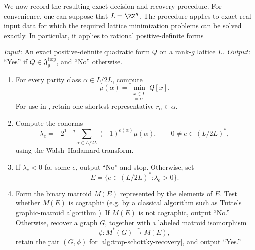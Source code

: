 \documentclass[11pt,letterpaper]{amsart}
\begin{document}
We now record the resulting exact decision-and-recovery procedure.
For convenience, one can suppose that $L=\ZZ^g$. The procedure applies to exact real input data for which the required lattice minimization problems can be solved exactly. In particular, it applies to rational positive-definite forms.

\begin{alg}
\label{alg:trop-schottky-decision}
\emph{Input:} An exact positive-definite quadratic form $Q$ on a
rank-$g$ lattice $L$.
\emph{Output:} ``Yes'' if $Q\in\mathfrak{J}^{\mathrm{trop}}_g$,
and ``No'' otherwise.

\begin{enumerate}
    \item
    For every parity class $\alpha\in L/2L$, compute
    \[
        \mu(\alpha)
        =
        \min_{\substack{x\in L\\ [x]=\alpha}} Q[x].
    \]
    For use in , retain one
    shortest representative $r_\alpha\in\alpha$.

    \item
    Compute the conorms
    \[
        \lambda_e
        =
        -2^{1-g}
        \sum_{\alpha\in L/2L}
        (-1)^{e(\alpha)}\mu(\alpha),
        \qquad
        0\neq e\in(L/2L)^*,
    \]
    using the Walsh--Hadamard transform.

    \item
    If $\lambda_e<0$ for some $e$, output ``No'' and stop.
    Otherwise, set
    \[
        E=\{e\in(L/2L)^*:\lambda_e>0\}.
    \]


    \item Form the binary matroid $M(E)$ represented by the elements of $E$. Test whether $M(E)$ is cographic (e.g. by a classical algorithm such as Tutte’s graphic-matroid algorithm \cite{tutte}). If $M(E)$ is not cographic, output ``No.'' Otherwise, recover a graph $G$, together with a labeled matroid isomorphism
\[
    \phi:M^*(G)\xrightarrow{\sim}M(E),
\]
retain the pair $(G,\phi)$ for \cref{alg:trop-schottky-recovery}, and output ``Yes.''
\end{enumerate}
\end{alg}
\end{document}
